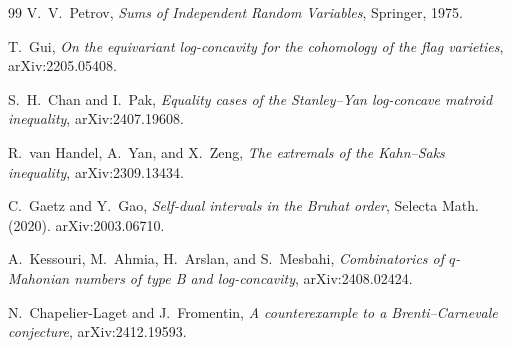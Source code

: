 \documentclass[11pt]{amsart}
\theoremstyle{plain}
\theoremstyle{definition}
\theoremstyle{remark}
\begin{document}
\begin{thebibliography}{99}
V.~V.~Petrov, \emph{Sums of Independent Random Variables}, Springer, 1975.

T.~Gui, \emph{On the equivariant log-concavity for the cohomology of the
flag varieties}, arXiv:2205.05408.

S.~H.~Chan and I.~Pak, \emph{Equality cases of the Stanley--Yan log-concave
matroid inequality}, arXiv:2407.19608.

R.~van Handel, A.~Yan, and X.~Zeng, \emph{The extremals of the Kahn--Saks
inequality}, arXiv:2309.13434.

C.~Gaetz and Y.~Gao, \emph{Self-dual intervals in the Bruhat order}, Selecta
Math. (2020). arXiv:2003.06710.

A.~Kessouri, M.~Ahmia, H.~Arslan, and S.~Mesbahi, \emph{Combinatorics of
$q$-Mahonian numbers of type B and log-concavity}, arXiv:2408.02424.

N.~Chapelier-Laget and J.~Fromentin, \emph{A counterexample to a
Brenti--Carnevale conjecture}, arXiv:2412.19593.

\end{thebibliography}
\end{document}
